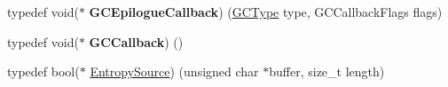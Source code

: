 \begin{DoxyCompactItemize}
\item 
\hypertarget{namespacev8_a4a818ae1aee0cb378a4c2037dfc4a4c2}{}typedef void($\ast$ {\bfseries G\+C\+Epilogue\+Callback}) (\hyperlink{namespacev8_ac109d6f27e0c0f9ef4e98bcf7a806cf2}{G\+C\+Type} type, G\+C\+Callback\+Flags flags)\label{namespacev8_a4a818ae1aee0cb378a4c2037dfc4a4c2}

\item 
\hypertarget{namespacev8_a226458957ce3c253b9a9f539bb5ddad4}{}typedef void($\ast$ {\bfseries G\+C\+Callback}) ()\label{namespacev8_a226458957ce3c253b9a9f539bb5ddad4}

\item 
typedef bool($\ast$ \hyperlink{namespacev8_ab699f4bbbb56350e6e915682e420fcdc}{Entropy\+Source}) (unsigned char $\ast$buffer, size\+\_\+t length)
\end{DoxyCompactItemize}
